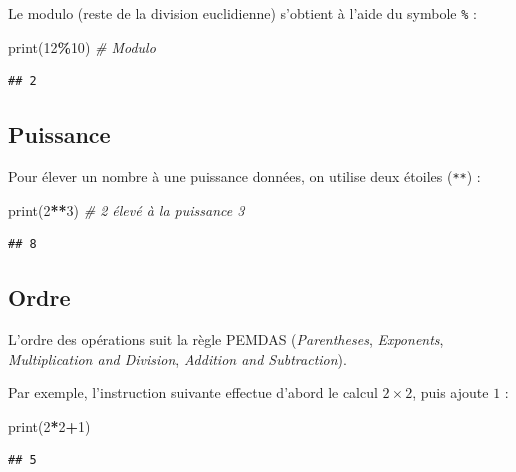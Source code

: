 \documentclass[
  12pt,
]{book}
\newenvironment{Shaded}{\begin{snugshade}}{\end{snugshade}}
\newcommand{\BuiltInTok}[1]{#1}
\newcommand{\CommentTok}[1]{\textcolor[rgb]{0.56,0.35,0.01}{\textit{#1}}}
\newcommand{\DecValTok}[1]{\textcolor[rgb]{0.00,0.00,0.81}{#1}}
\newcommand{\NormalTok}[1]{#1}
\newcommand{\OperatorTok}[1]{\textcolor[rgb]{0.81,0.36,0.00}{\textbf{#1}}}
\numberwithin{equation}{section}
\numberwithin{countremarque}{section}
\begin{document}
Le modulo (reste de la division euclidienne) s'obtient à l'aide du symbole \texttt{\%} :

\begin{Shaded}
\begin{Highlighting}[]
\BuiltInTok{print}\NormalTok{(}\DecValTok{12}\OperatorTok{\%}\DecValTok{10}\NormalTok{) }\CommentTok{\# Modulo}
\end{Highlighting}
\end{Shaded}

\begin{lstlisting}
## 2
\end{lstlisting}

\subsection{Puissance}\label{puissance}

Pour élever un nombre à une puissance données, on utilise deux étoiles (\texttt{**}) :

\begin{Shaded}
\begin{Highlighting}[]
\BuiltInTok{print}\NormalTok{(}\DecValTok{2}\OperatorTok{**}\DecValTok{3}\NormalTok{) }\CommentTok{\# 2 élevé à la puissance 3}
\end{Highlighting}
\end{Shaded}

\begin{lstlisting}
## 8
\end{lstlisting}

\subsection{Ordre}\label{ordre}

L'ordre des opérations suit la règle PEMDAS (\emph{Parentheses}, \emph{Exponents}, \emph{Multiplication and Division}, \emph{Addition and Subtraction}).

Par exemple, l'instruction suivante effectue d'abord le calcul \(2\times 2\), puis ajoute \(1\) :

\begin{Shaded}
\begin{Highlighting}[]
\BuiltInTok{print}\NormalTok{(}\DecValTok{2}\OperatorTok{*}\DecValTok{2}\OperatorTok{+}\DecValTok{1}\NormalTok{) }
\end{Highlighting}
\end{Shaded}

\begin{lstlisting}
## 5
\end{lstlisting}
\end{document}
